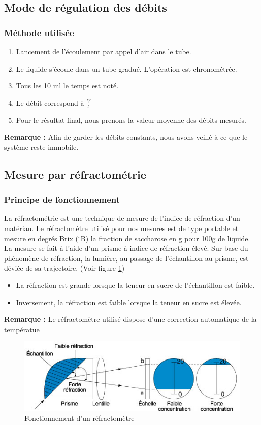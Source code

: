 \documentclass[a4paper,11pt]{article}
\begin{document}
	\subsection{Mode de régulation des débits}
		\subsubsection{Méthode utilisée}
			\begin{enumerate}
				\item Lancement de l'écoulement par appel d'air dans le tube.
				\item Le liquide s'écoule dans un tube gradué. L'opération est chronométrée.
				\item Tous les 10 ml le temps est noté. 
				\item Le débit correspond à $\frac{V}{t}$
				\item Pour le résultat final, nous prenons la valeur moyenne des débits mesurés.
			\end{enumerate}
			\textbf{Remarque :} Afin de garder les débits constants, nous avons veillé à ce que le système reste immobile.
	\subsection{Mesure par réfractométrie}
		\subsubsection{Principe de fonctionnement}
			La réfractométrie est une technique de mesure de l'indice de réfraction d'un matériau. Le réfractomètre utilisé pour nos mesures est de type portable et mesure en degrés Brix ($^{\circ}$B) la fraction de saccharose en g pour 100g de liquide. La mesure se fait à l'aide d'un prisme à indice de réfraction élevé. Sur base du phénomène de réfraction, la lumière, au passage de l'échantillon au prisme, est déviée de sa trajectoire. (Voir figure \ref{refractometrie})
			\begin{itemize}
				\item La réfraction est grande lorsque la teneur en sucre de l'échantillon est faible.
				\item Inversement, la réfraction est faible lorsque la teneur en sucre est élevée.
			\end{itemize}
			\textbf{Remarque :} Le réfractomètre utilisé dispose d'une correction automatique de la températue
			\begin{figure}[h]
				\centering
				\includegraphics[width=1.0\textwidth]{pictures/refractometre.jpg}
				\caption{Fonctionnement d'un réfractomètre \label{refractometrie}}
			\end{figure}
\end{document}
